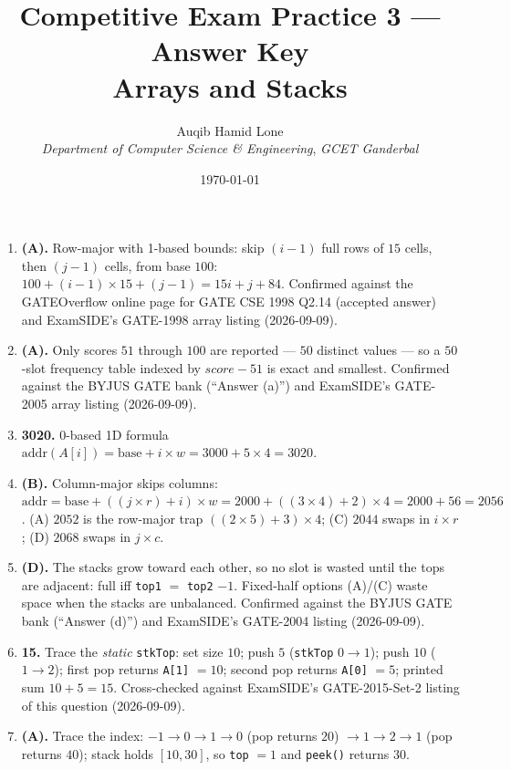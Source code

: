 \documentclass[11pt]{article}
\title{Competitive Exam Practice 3 --- Answer Key\\\large Arrays and Stacks}
\author{Auqib Hamid Lone\\[0.3em]
  \emph{Department of Computer Science \& Engineering}, \emph{GCET Ganderbal}}
\date{\today}
\begin{document}
\maketitle

\begin{enumerate}
\item[\textbf{Q1}] \textbf{(A).} Row-major with 1-based bounds: skip $(i-1)$ full rows of $15$ cells, then $(j-1)$ cells, from base $100$: $100 + (i-1)\times 15 + (j-1) = 15i + j + 84$. Confirmed against the GATEOverflow online page for GATE CSE 1998 Q2.14 (accepted answer) and ExamSIDE's GATE-1998 array listing (2026-09-09).

\item[\textbf{Q2}] \textbf{(A).} Only scores $51$ through $100$ are reported --- $50$ distinct values --- so a $50$-slot frequency table indexed by $\mathit{score} - 51$ is exact and smallest. Confirmed against the BYJUS GATE bank (``Answer (a)'') and ExamSIDE's GATE-2005 array listing (2026-09-09).

\item[\textbf{Q3}] \textbf{3020.} 0-based 1D formula $\mathrm{addr}(A[i]) = \mathrm{base} + i \times w = 3000 + 5 \times 4 = 3020$.

\item[\textbf{Q4}] \textbf{(B).} Column-major skips columns: $\mathrm{addr} = \mathrm{base} + ((j \times r) + i) \times w = 2000 + ((3 \times 4) + 2) \times 4 = 2000 + 56 = 2056$. (A) $2052$ is the row-major trap $((2\times 5)+3)\times 4$; (C) $2044$ swaps in $i \times r$; (D) $2068$ swaps in $j \times c$.

\item[\textbf{Q5}] \textbf{(D).} The stacks grow toward each other, so no slot is wasted until the tops are adjacent: full iff \texttt{top1} $=$ \texttt{top2} $- 1$. Fixed-half options (A)/(C) waste space when the stacks are unbalanced. Confirmed against the BYJUS GATE bank (``Answer (d)'') and ExamSIDE's GATE-2004 listing (2026-09-09).

\item[\textbf{Q6}] \textbf{15.} Trace the \emph{static} \texttt{stkTop}: set size $10$; push $5$ (\texttt{stkTop} $0\to 1$); push $10$ ($1\to 2$); first pop returns \texttt{A[1]} $= 10$; second pop returns \texttt{A[0]} $= 5$; printed sum $10 + 5 = 15$. Cross-checked against ExamSIDE's GATE-2015-Set-2 listing of this question (2026-09-09).

\item[\textbf{Q7}] \textbf{(A).} Trace the index: $-\!1 \to 0 \to 1 \to 0$ (pop returns $20$) $\to 1 \to 2 \to 1$ (pop returns $40$); stack holds $[10, 30]$, so \texttt{top} $= 1$ and \texttt{peek()} returns $30$.


\end{enumerate}
\end{document}
